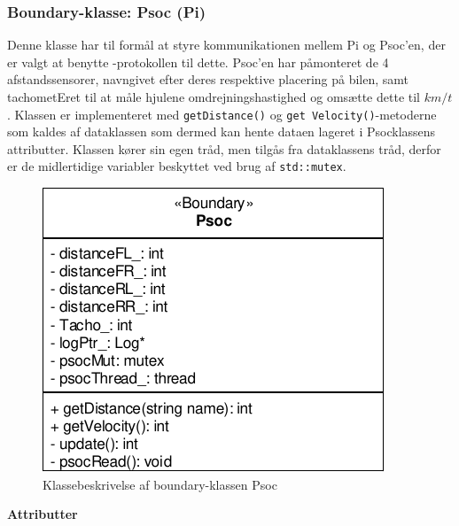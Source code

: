 \subsubsection{Boundary-klasse: Psoc (Pi)}

Denne klasse har til formål at styre kommunikationen mellem Pi og Psoc'en, der er valgt at benytte \IIC-protokollen til dette. Psoc'en har påmonteret de 4 afstandssensorer, navngivet efter deres respektive placering på bilen, samt tachometEret til at måle hjulene omdrejningshastighed og omsætte dette til $km/t$. Klassen er implementeret med \texttt{getDistance()} og \texttt{get Velocity()}-metoderne som kaldes af dataklassen som dermed kan hente dataen lageret i Psocklassens attributter. Klassen kører sin egen tråd, men tilgås fra dataklassens tråd, derfor er de midlertidige variabler beskyttet ved brug af \texttt{std::mutex}.

\begin{figure}[h]
\centering
\includegraphics[]{../fig/diagrammer/bil/cd_psoc.pdf}
\caption{Klassebeskrivelse af boundary-klassen Psoc}
\label{fig:cd_psoc}
\end{figure}

\textbf{Attributter}

